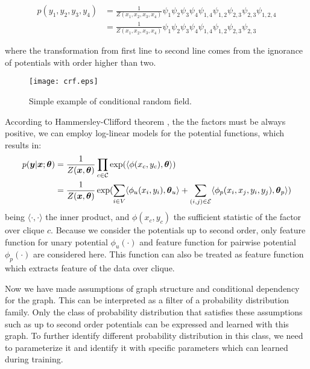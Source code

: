 \[
\begin{aligned}
p(y_1, y_2, y_3, y_4) &= \frac{1}{Z(x_1, x_2, x_3, x_4)}\psi_1\psi_2\psi_3\psi_4\psi_{1,4}\psi_{1,2}\psi_{2,3}\psi_{2,3}\psi_{1,2,4} \\
&=\frac{1}{Z(x_1, x_2, x_3, x_4)}\psi_1\psi_2\psi_3\psi_4\psi_{1,4}\psi_{1,2}\psi_{2,3}\psi_{2,3}
\end{aligned}
\]

where the transformation from first line to second line comes from the ignorance of potentials with order higher than two.
\begin{figure}[H]
	\begin{center}
		\texttt{[image: crf.eps]}
		\caption{Simple example of conditional random field.}		
		\label{crf}
	\end{center}
\end{figure} 
According to Hammersley-Clifford theorem \cite{hammersley1968markov}, the the factors must be always positive, we can employ log-linear models for the potential functions, which results in:
\begin{equation}
\label{crf_potential}
\begin{aligned}
p(\boldsymbol y | \boldsymbol x; \boldsymbol \theta) &= \frac{1}{Z(\boldsymbol x, \boldsymbol \theta)}\prod_{c\in \mathcal{C}}\exp(\langle\phi(x_c, y_c), \boldsymbol \theta\rangle)\\
&=\frac{1}{Z(\boldsymbol x, \boldsymbol \theta)}\exp(\sum_{i\in V}\langle\phi_u(x_i, y_i), \boldsymbol{\theta}_u\rangle + \sum_{(i,j)\in \mathcal{E}}\langle\phi_p(x_i, x_j, y_i, y_j), \boldsymbol{\theta}_p\rangle)
\end{aligned}
\end{equation}
being $\langle \cdot, \cdot \rangle$ the inner product, and $\phi(x_c, y_c)$ the sufficient statistic of the factor over clique $c$. Because we consider the potentials up to second order, only feature function for unary potential $\phi_u(\cdot)$ and feature function for pairwise potential $\phi_p(\cdot)$ are considered here. This function can also be treated as feature function which extracts feature of the data over clique. 

Now we have made assumptions of graph structure and conditional dependency for the graph. This can be interpreted as a filter of a probability distribution family. Only the class of probability distribution that satisfies these assumptions such as up to second order potentials can be expressed and learned with this graph. To further identify different probability distribution in this class, we need to parameterize it and identify it with specific parameters which can learned during training. 

